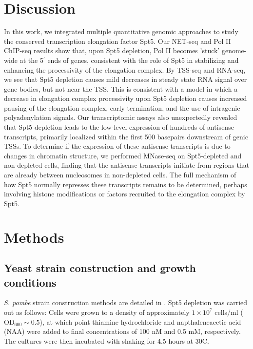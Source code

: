 \section{Discussion}

In this work, we integrated multiple quantitative genomic approaches to study the conserved transcription elongation factor Spt5.
Our NET-seq and Pol II ChIP-seq results show that, upon Spt5 depletion, Pol II becomes 'stuck' genome-wide at the 5$^\prime$ ends of genes, consistent with the role of Spt5 in stabilizing and enhancing the processivity of the elongation complex.
By TSS-seq and RNA-seq, we see that Spt5 depletion causes mild decreases in steady state RNA signal over gene bodies, but not near the TSS.
This is consistent with a model in which a decrease in elongation complex processivity upon Spt5 depletion causes increased pausing of the elongation complex, early termination, and the use of intragenic polyadenylation signals.
Our transcriptomic assays also unexpectedly revealed that Spt5 depletion leads to the low-level expression of hundreds of antisense transcripts, primarily localized within the first 500 basepairs downstream of genic TSSs.
To determine if the expression of these antisense transcripts is due to changes in chromatin structure, we performed MNase-seq on Spt5-depleted and non-depleted cells, finding that the antisense transcripts initiate from regions that are already between nucleosomes in non-depleted cells.
The full mechanism of how Spt5 normally represses these transcripts remains to be determined, perhaps involving histone modifications or factors recruited to the elongation complex by Spt5.

\section{Methods}

\subsection{Yeast strain construction and growth conditions}

\textit{S. pombe} strain construction methods are detailed in \citet{shetty2017}.
Spt5 depletion was carried out as follows: Cells were grown to a density of approximately $1 \times 10^7$ cells/ml ($\text{OD}_{600} \sim 0.5$), at which point thiamine hydrochloride and napthaleneacetic acid (NAA) were added to final concentrations of 100 nM and 0.5 mM, respectively.
The cultures were then incubated with shaking for 4.5 hours at 30\textdegree C.

